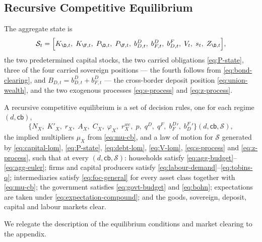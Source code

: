 \subsection{Recursive Competitive Equilibrium}
\label{sec:rce}

The aggregate state is
\begin{equation}
\mathcal{S}_t=\Bigl[
K_{\D,t},\;K_{\F,t},\;
P_{\D,t},\;P_{\F,t},\;
b^{D}_{D,t},\;b^{D}_{F,t},\;b^{F}_{D,t},\;
V_t,\;s_t,\;Z_{\D,t}\Bigr],
\label{eq:state}
\end{equation}
the two predetermined capital stocks, the two carried obligations
\eqref{eq:P-state}, three of the four carried sovereign positions --- the fourth
follows from \eqref{eq:bond-clearing}, and $B_{D,t}=b^{D}_{D,t}+b^{D}_{F,t}$ ---
the cross-border deposit position \eqref{eq:union-wealth}, and the two exogenous
processes \eqref{eq:s-process} and \eqref{eq:z-process}.

\begin{definition}
\label{def:rce}
A recursive competitive equilibrium is a set of decision rules, one for each
regime $(d,\mathsf{cb})$,
\[
\bigl\{N_X,\;K'_X,\;r_X,\;A_X,\;C_X,\;\varphi_X,\;r^{wc}_X,\;
p,\;q^{D},\;q^{F},\;b^{D}_{F}{}',\;b^{F}_{D}{}'\bigr\}(d,\mathsf{cb},\mathcal{S}),
\]
the implied multipliers $\mu_X$ from \eqref{eq:mu-cb}, and a law of motion for
$\mathcal{S}$ generated by \eqref{eq:capital-lom}, \eqref{eq:P-state},
\eqref{eq:debt-lom}, \eqref{eq:V-lom}, \eqref{eq:s-process} and
\eqref{eq:z-process}, such that at every $(d,\mathsf{cb},\mathcal{S})$: households
satisfy \eqref{eq:agg-budget}--\eqref{eq:agg-euler}; firms and capital producers
satisfy \eqref{eq:labour-demand}--\eqref{eq:tobins-q}; intermediaries satisfy
\eqref{eq:foc-general} for every asset class together with \eqref{eq:mu-cb};
the government satisfies \eqref{eq:govt-budget} and \eqref{eq:bohn}; expectations
are taken under \eqref{eq:expectation-compound}; and the goods, sovereign, deposit,
capital and labour markets clear.
\end{definition}

We relegate the description of the equilibrium conditions and market clearing to the appendix.
